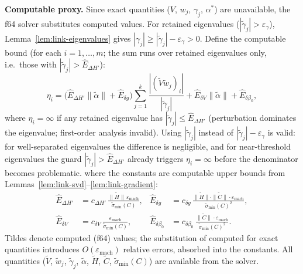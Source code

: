 \begin{lemma}
\textbf{Computable proxy.}
Since exact quantities ($V$, $w_j$, $\gamma_j$, $\alpha^*$)
are unavailable, the f64 solver substitutes computed values.
For retained eigenvalues ($|\tilde\gamma_j| > \varepsilon_\gamma$),
Lemma~\ref{lem:link-eigenvalues} gives
$|\gamma_j| \geq |\tilde\gamma_j| - \varepsilon_\gamma > 0$.
Define the computable bound (for each $i = 1, \ldots, m$;
the sum runs over retained eigenvalues only,
i.e.\ those with $|\tilde\gamma_j| > \hat E_{\Delta H'}$):
\begin{equation}\label{eq:eta-computable}
  \eta_i
  = \bigl(\hat E_{\Delta H'} \|\tilde\alpha\|
    + \hat E_{\delta g}\bigr)
    \sum_{j=1}^{k}
      \frac{|(\tilde V \tilde w_j)_i|}
           {|\tilde\gamma_j|}
  + \hat E_{\delta V} \|\tilde\alpha\|
  + \hat E_{\delta\beta_0},
\end{equation}
where $\eta_i = \infty$ if any retained eigenvalue has
$|\tilde\gamma_j| \leq \hat E_{\Delta H'}$ (perturbation
dominates the eigenvalue; first-order analysis invalid).
Using $|\tilde\gamma_j|$ instead of $|\tilde\gamma_j| - \varepsilon_\gamma$
is valid: for well-separated eigenvalues the difference is negligible,
and for near-threshold eigenvalues the guard $|\tilde\gamma_j| > \hat E_{\Delta H'}$
already triggers $\eta_i = \infty$ before the denominator becomes problematic.
where the constants are computable upper bounds from
Lemmas~\ref{lem:link-svd}--\ref{lem:link-gradient}:
\begin{align*}
  \hat E_{\Delta H'}
  &= c_{\Delta H'}\,
     \frac{\|\tilde H\|\, \varepsilon_{\mathrm{mach}}}
          {\tilde\sigma_{\min}(C)},
  &
  \hat E_{\delta g}
  &= c_{\delta g}\,
     \frac{\|\tilde H\| \cdot \|\tilde C\| \cdot
           \varepsilon_{\mathrm{mach}}}
          {\tilde\sigma_{\min}(C)^2}, \\
  \hat E_{\delta V}
  &= c_{\delta V}\,
     \frac{\varepsilon_{\mathrm{mach}}}
          {\tilde\sigma_{\min}(C)},
  &
  \hat E_{\delta\beta_0}
  &= c_{\delta\beta_0}\,
     \frac{\|\tilde C\| \cdot
           \varepsilon_{\mathrm{mach}}}
          {\tilde\sigma_{\min}(C)^2}.
\end{align*}
Tildes denote computed (f64) values; the substitution
of computed for exact quantities introduces $O(\varepsilon_{\mathrm{mach}})$
relative errors, absorbed into the constants.
All quantities ($\tilde V$, $\tilde w_j$, $\tilde\gamma_j$,
$\tilde\alpha$, $\tilde H$, $\tilde C$,
$\tilde\sigma_{\min}(C)$) are available from the solver.


\end{lemma}
